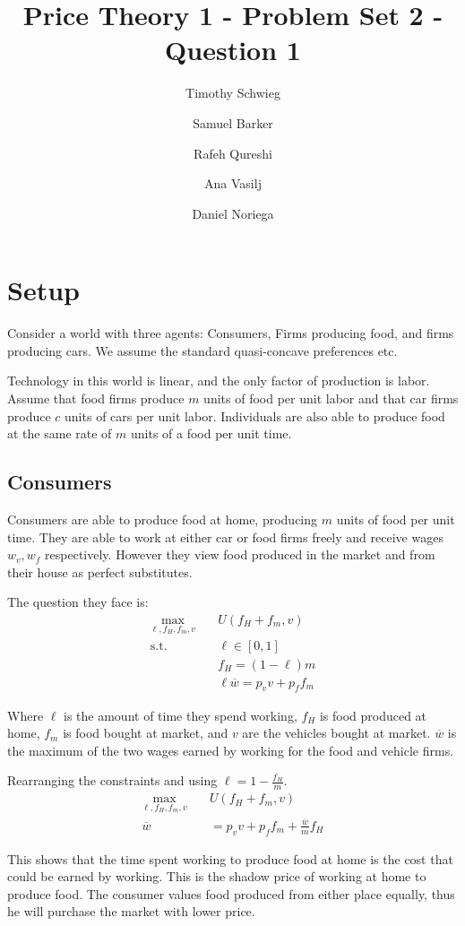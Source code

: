 \documentclass[12pt]{paper}
\title{Price Theory 1 - Problem Set 2 - Question 1}
\author{Timothy Schwieg \and Samuel Barker \and Rafeh Qureshi \and Ana Vasilj
 \and Daniel Noriega}
\begin{document}
\maketitle

\section*{Setup}
Consider a world with three agents: Consumers, Firms producing food,
and firms producing cars. We assume the standard quasi-concave
preferences etc.

Technology in this world is linear, and the only factor of production
is labor. Assume that food firms produce $m$ units of food per unit
labor and that car firms produce $c$ units of cars per unit
labor. Individuals are also able to produce food at the same rate of
$m$ units of a food per unit time.

\subsection*{Consumers}

Consumers are able to produce food at home, producing $m$ units of
food per unit time. They are able to work at either car or food firms
freely and receive wages $w_v, w_f$ respectively. However they view
food produced in the market and from their house as perfect
substitutes.

The question they face is:
\begin{align*}
  \max_{\ell,f_H,f_m,v} \quad &U( f_H + f_m, v)\\
  \text{s.t. } &\ell \in [0,1]\\
                       &f_H = (1-\ell)m\\
  &\ell \overline{w} = p_v v + p_f f_m
\end{align*}

Where $\ell$ is the amount of time they spend working, $f_H$ is food
produced at home, $f_m$ is food bought at market, and $v$ are the
vehicles bought at market. $\overline{w}$ is the maximum of the two
wages earned by working for the food and vehicle firms.

Rearranging the constraints and using $\ell = 1 - \frac{f_H}{m}$. 
\begin{align*}
  \max_{\ell,f_H,f_m,v} \quad &U( f_H + f_m, v)\\
  \overline{w} &= p_v v + p_f f_m + \frac{ \overline{w}}{m} f_H
\end{align*}

This shows that the time spent working to produce food at home is the
cost that could be earned by working. This is the shadow price of
working at home to produce food. The consumer values food produced
from either place equally, thus he will purchase the market with lower
price.
\end{document}
